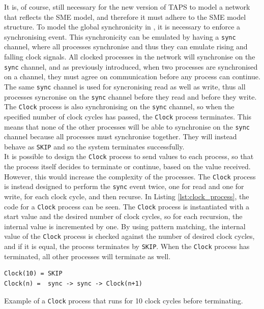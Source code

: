 It is, of course, still necessary for the new version of TAPS to model a \cspm{} network that reflects the SME model, and therefore it must adhere to the SME model structure. To model the global synchronicity in \cspm{}, it is necessary to enforce a synchronising event. This synchronicity can be emulated by having a \texttt{sync} channel, where all processes synchronise and thus they can emulate rising and falling clock signals. All clocked processes in the network will synchronise on the \texttt{sync} channel, and as previously introduced, when two processes are synchronised on a channel, they must agree on communication before any process can continue. The same \texttt{sync} channel is used for syncronising read as well as write, thus all processes syncronise on the \texttt{sync} channel before they read and before they write.
The \texttt{Clock} process is also synchronising on the \texttt{sync} channel, so when the specified number of clock cycles has passed, the \texttt{Clock} process terminates.
This means that none of the other processes will be able to synchronise on the \texttt{sync} channel because all processes must synchronise together. They will instead behave as \texttt{SKIP} and so the system terminates successfully.\\

It is possible to design the \texttt{Clock} process to send values to each process, so that the process itself decides to terminate or continue, based on the value received. However, this would increase the complexity of the processes. The \texttt{Clock} process is instead designed to perform the \texttt{sync} event twice, one for read and one for write, for each clock cycle, and then recurse. In Listing \ref{lst:clock_process}, the \cspm{} code for a \texttt{Clock} process can be seen. The \texttt{Clock} process is instantiated with a start value and the desired number of clock cycles, so for each recursion, the internal value is incremented by one. By using pattern matching, the internal value of the \texttt{Clock} process is checked against the number of desired clock cycles, and if it is equal, the process terminates by \texttt{SKIP}. When the \texttt{Clock} process has terminated, all other processes will terminate as well.
\begin{listing}
\begin{verbatim}
Clock(10) = SKIP
Clock(n) =  sync -> sync -> Clock(n+1)
\end{verbatim}
\caption{Example of a \texttt{Clock} process that runs for 10 clock cycles before terminating. }
\label{lst:clock_process}
\end{listing}

